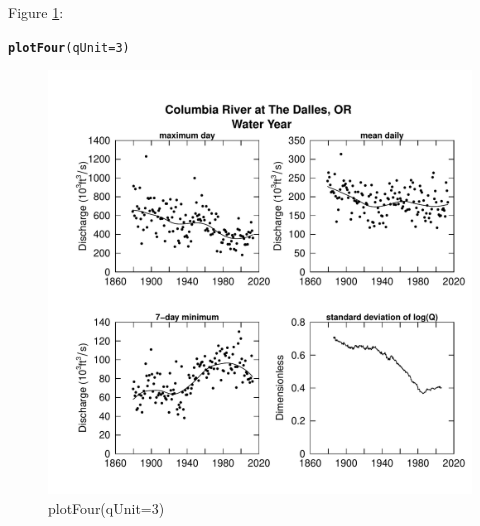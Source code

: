 \documentclass[a4paper,11pt]{article}\usepackage{graphicx, color}
\makeatletter
\newcommand{\hlfunctioncall}[1]{\textcolor[rgb]{0.501960784313725,0,0.329411764705882}{\textbf{#1}}}%
\newenvironment{kframe}{%
 \def\at@end@of@kframe{}%
 \ifinner\ifhmode%
  \def\at@end@of@kframe{\end{minipage}}%
  \begin{minipage}{\columnwidth}%
 \fi\fi%
 \def\FrameCommand##1{\hskip\@totalleftmargin \hskip-\fboxsep
 \colorbox{shadecolor}{##1}\hskip-\fboxsep
     \hskip-\linewidth \hskip-\@totalleftmargin \hskip\columnwidth}%
 \MakeFramed {\advance\hsize-\width
   \@totalleftmargin\z@ \linewidth\hsize
   \@setminipage}}%
 {\par\unskip\endMakeFramed%
 \at@end@of@kframe}
\newenvironment{knitrout}{}{} %
\makeatother
\begin{document}
Figure \ref{fig:plotFour}:
\begin{knitrout}
\color{fgcolor}\begin{kframe}
\begin{alltt}
\hlfunctioncall{plotFour}(qUnit=3)
\end{alltt}
\end{kframe}\begin{figure}[]

\includegraphics[width=1\linewidth,height=1\linewidth]{figure/plotFour} \caption[plotFour(qUnit=3)]{plotFour(qUnit=3)\label{fig:plotFour}}
\end{figure}


\end{knitrout}
\end{document}
